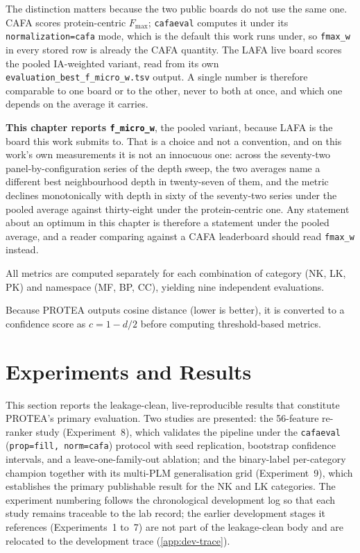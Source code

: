 The distinction matters because the two public boards do not use the same one.
CAFA scores protein-centric $F_{\max}$; \texttt{cafaeval} computes it under its
\texttt{normalization=\textquotesingle cafa\textquotesingle} mode, which is the
default this work runs under, so \texttt{fmax\_w} in every stored row is already
the CAFA quantity. The LAFA live board scores the pooled IA-weighted variant,
read from its own \texttt{evaluation\_best\_f\_micro\_w.tsv} output. A single
number is therefore comparable to one board or to the other, never to both at
once, and which one depends on the average it carries.

\textbf{This chapter reports \texttt{f\_micro\_w}}, the pooled variant, because
LAFA is the board this work submits to. That is a choice and not a convention,
and on this work's own measurements it is not an innocuous one: across the
seventy-two panel-by-configuration series of the depth sweep, the two averages
name a different best neighbourhood depth in twenty-seven of them, and the
metric declines monotonically with depth in sixty of the seventy-two series
under the pooled average against thirty-eight under the protein-centric one.
Any statement about an optimum in this chapter is therefore a statement under
the pooled average, and a reader comparing against a CAFA leaderboard should
read \texttt{fmax\_w} instead.

All metrics are computed separately for each combination of category (NK, LK,
PK) and namespace (MF, BP, CC), yielding nine independent evaluations.

Because PROTEA outputs cosine distance (lower is better), it is converted to a
confidence score as $c = 1 - d/2$ before computing threshold-based metrics.

\section{Experiments and Results}
\label{sec:experiments-results}

This section reports the leakage-clean, live-reproducible results that
constitute PROTEA's primary evaluation. Two studies are presented: the
56-feature re-ranker study (Experiment~8), which validates the pipeline under
the \texttt{cafaeval} (\texttt{prop=fill, norm=cafa}) protocol with seed
replication, bootstrap confidence intervals, and a leave-one-family-out
ablation; and the binary-label per-category champion together with its
multi-PLM generalisation grid (Experiment~9), which establishes the primary
publishable result for the NK and LK categories. The experiment numbering
follows the chronological development log so that each study remains traceable
to the lab record; the earlier development stages it references
(Experiments~1 to~7) are not part of the leakage-clean body and are relocated
to the development trace (\cref{app:dev-trace}).


